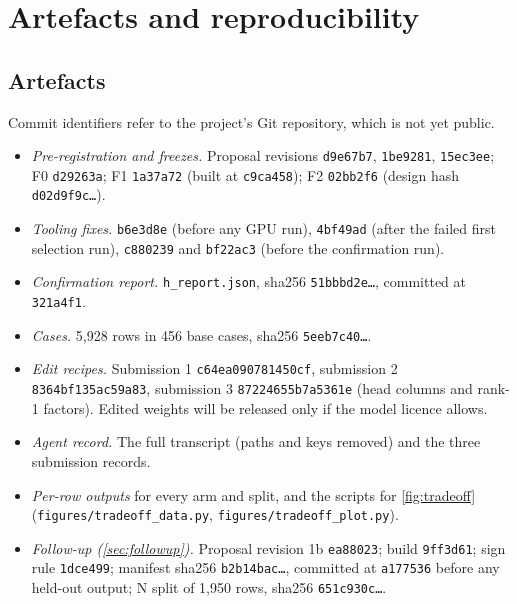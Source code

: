 \section{Artefacts and reproducibility}
\label{app:artefacts}

\subsection{Artefacts}

Commit identifiers refer to the project's Git repository, which is not yet public.
\begin{itemize}[leftmargin=*]
  \item \emph{Pre-registration and freezes.} Proposal revisions \texttt{d9e67b7}, \texttt{1be9281}, \texttt{15ec3ee};
        F0 \texttt{d29263a}; F1 \texttt{1a37a72} (built at \texttt{c9ca458}); F2 \texttt{02bb2f6} (design hash
        \texttt{d02d9f9c\ldots}).
  \item \emph{Tooling fixes.} \texttt{b6e3d8e} (before any GPU run), \texttt{4bf49ad} (after the failed first
        selection run), \texttt{c880239} and \texttt{bf22ac3} (before the confirmation run).
  \item \emph{Confirmation report.} \texttt{h\_report.json}, sha256 \texttt{51bbbd2e\ldots}, committed at
        \texttt{321a4f1}.
  \item \emph{Cases.} 5,928 rows in 456 base cases, sha256 \texttt{5eeb7c40\ldots}.
  \item \emph{Edit recipes.} Submission 1 \texttt{c64ea090781450cf}, submission 2 \texttt{8364bf135ac59a83},
        submission 3 \texttt{87224655b7a5361e} (head columns and rank-1 factors). Edited weights will be released
        only if the model licence allows.
  \item \emph{Agent record.} The full transcript (paths and keys removed) and the three submission records.
  \item \emph{Per-row outputs} for every arm and split, and the scripts for \cref{fig:tradeoff}
        (\texttt{figures/tradeoff\_data.py}, \texttt{figures/tradeoff\_plot.py}).
  \item \emph{Follow-up (\cref{sec:followup}).} Proposal revision 1b \texttt{ea88023}; build \texttt{9ff3d61}; sign
        rule \texttt{1dce499}; manifest sha256 \texttt{b2b14bac\ldots}, committed at \texttt{a177536} before any
        held-out output; N split of 1,950 rows, sha256 \texttt{651c930c\ldots}. 
\end{itemize}

